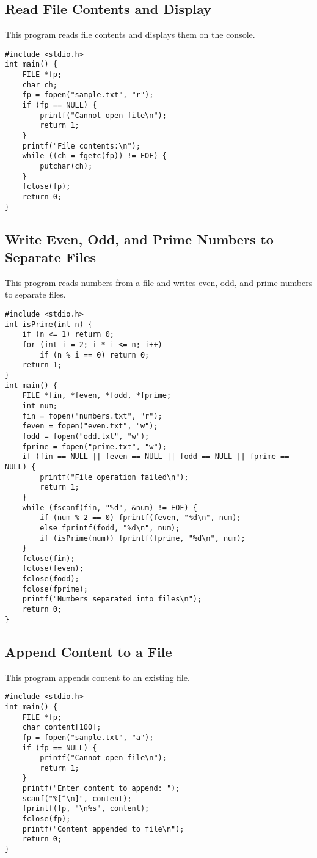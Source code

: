 \documentclass[a4paper,12pt]{article}
\begin{document}
\subsection{Read File Contents and Display}
This program reads file contents and displays them on the console.
\begin{lstlisting}[caption={Read File Contents and Display}]
#include <stdio.h>
int main() {
    FILE *fp;
    char ch;
    fp = fopen("sample.txt", "r");
    if (fp == NULL) {
        printf("Cannot open file\n");
        return 1;
    }
    printf("File contents:\n");
    while ((ch = fgetc(fp)) != EOF) {
        putchar(ch);
    }
    fclose(fp);
    return 0;
}
\end{lstlisting}
\clearpage

\subsection{Write Even, Odd, and Prime Numbers to Separate Files}
This program reads numbers from a file and writes even, odd, and prime numbers to separate files.
\begin{lstlisting}[caption={Write Even, Odd, and Prime Numbers to Separate Files}]
#include <stdio.h>
int isPrime(int n) {
    if (n <= 1) return 0;
    for (int i = 2; i * i <= n; i++)
        if (n % i == 0) return 0;
    return 1;
}
int main() {
    FILE *fin, *feven, *fodd, *fprime;
    int num;
    fin = fopen("numbers.txt", "r");
    feven = fopen("even.txt", "w");
    fodd = fopen("odd.txt", "w");
    fprime = fopen("prime.txt", "w");
    if (fin == NULL || feven == NULL || fodd == NULL || fprime == NULL) {
        printf("File operation failed\n");
        return 1;
    }
    while (fscanf(fin, "%d", &num) != EOF) {
        if (num % 2 == 0) fprintf(feven, "%d\n", num);
        else fprintf(fodd, "%d\n", num);
        if (isPrime(num)) fprintf(fprime, "%d\n", num);
    }
    fclose(fin);
    fclose(feven);
    fclose(fodd);
    fclose(fprime);
    printf("Numbers separated into files\n");
    return 0;
}
\end{lstlisting}
\clearpage

\subsection{Append Content to a File}
This program appends content to an existing file.
\begin{lstlisting}[caption={Append Content to a File}]
#include <stdio.h>
int main() {
    FILE *fp;
    char content[100];
    fp = fopen("sample.txt", "a");
    if (fp == NULL) {
        printf("Cannot open file\n");
        return 1;
    }
    printf("Enter content to append: ");
    scanf("%[^\n]", content);
    fprintf(fp, "\n%s", content);
    fclose(fp);
    printf("Content appended to file\n");
    return 0;
}
\end{lstlisting}
\clearpage
\end{document}
